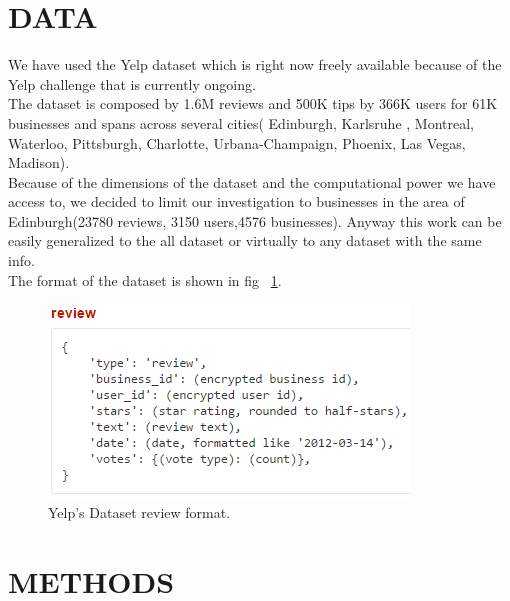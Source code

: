 \documentclass[11pt]{article}
\begin{document}
\section{DATA}
We have used the Yelp dataset\cite{yelp} which is right now freely available because of the Yelp challenge that is currently ongoing.\\
The dataset is composed by 1.6M reviews and 500K tips by 366K users for 61K businesses and spans across several cities( Edinburgh, Karlsruhe
, Montreal, Waterloo, Pittsburgh, Charlotte, Urbana-Champaign, Phoenix, Las Vegas, Madison).\\
Because of the dimensions of the dataset and the computational power we have access to, we decided to limit our investigation to businesses in the area of Edinburgh(23780 reviews, 3150 users,4576 businesses). Anyway this work can be easily generalized to the all dataset or virtually to any dataset with the same info.\\
The format of the dataset is shown in fig ~\ref{review}.
\begin{figure}[thpb]
	\includegraphics[scale=0.75]{img/review.png}
	\caption{Yelp's Dataset review format.}
	\label{review}
\end{figure}
\section{METHODS}
\end{document}

